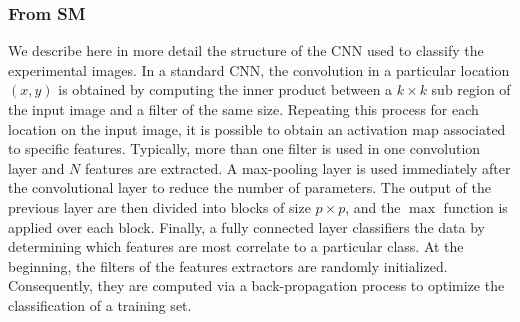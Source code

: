 
\subsubsection{From SM}
We describe here in more detail the structure of the \ac{CNN} used to classify the experimental images.
In a standard \ac{CNN}, the convolution in a particular location $(x,y)$ is obtained by computing the inner product between a $k \times k$ sub region of the input image and a filter of the same size. Repeating this process for each location on the input image, it is possible to obtain an activation map associated to specific features. Typically, more than one filter is used in one convolution layer and $N$ features are extracted.
A max-pooling layer is used immediately after the convolutional layer to reduce the number of parameters. The output of the previous layer are then divided into blocks of size $p \times p$, and the $\max$ function is applied over each block.
Finally, a fully connected layer classifiers the data by determining which features are most correlate to a particular class.
At the beginning, the filters of the features extractors are randomly initialized. Consequently, they are computed via a back-propagation process to optimize the classification of a training set.


